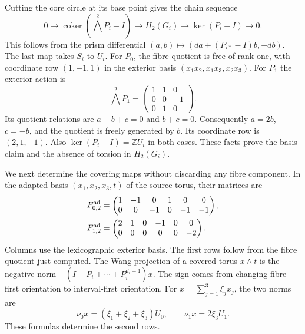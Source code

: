 Cutting the core circle at its base point gives the chain sequence
\begin{equation}\label{mt:eq:wang}
0\longrightarrow\operatorname{coker}(\bigwedge^2P_i-I)
\longrightarrow H_2(G_i)
\longrightarrow\ker(P_i-I)\longrightarrow0.
\end{equation}
This follows from the prism differential
$(a,b)\mapsto(da+(P_{i*}-I)b,-db)$.
The last map takes $S_i$ to $U_i$.
For $P_0$, the fibre quotient is free of rank one, with coordinate row
$(1,-1,1)$ in the exterior basis $(x_1x_2,x_1x_3,x_2x_3)$.
For $P_1$ the exterior action is
\[
\bigwedge^2P_1=\begin{pmatrix}1&1&0\\0&0&-1\\0&1&0\end{pmatrix}.
\]
Its quotient relations are $a-b+c=0$ and $b+c=0$.
Consequently $a=2b$, $c=-b$, and the quotient is freely generated by $b$.
Its coordinate row is $(2,1,-1)$.
Also $\ker(P_i-I)=\mathbb ZU_i$ in both cases.
These facts prove the basis claim and the absence of torsion in $H_2(G_i)$.

We next determine the covering maps without discarding any fibre component.
In the adapted basis $(x_1,x_2,x_3,t)$ of the source torus, their matrices are
\begin{equation}\label{mt:eq:adapted}
\begin{aligned}
F^{\rm ad}_{0,2}&=\begin{pmatrix}1&-1&0&1&0&0\\0&0&-1&0&-1&-1\end{pmatrix},\\
F^{\rm ad}_{1,2}&=\begin{pmatrix}2&1&0&-1&0&0\\0&0&0&0&0&-2\end{pmatrix}.
\end{aligned}
\end{equation}
Columns use the lexicographic exterior basis.
The first rows follow from the fibre quotient just computed.
The Wang projection of a covered torus $x\wedge t$ is the negative norm
$-(I+P_i+\cdots+P_i^{d_i-1})x$.
The sign comes from changing fibre-first orientation to interval-first orientation.
For $x=\sum_{j=1}^3\xi_jx_j$, the two norms are
\[
\nu_0x=(\xi_1+\xi_2+\xi_3)U_0,\qquad \nu_1x=2\xi_3U_1.
\]
These formulas determine the second rows.

